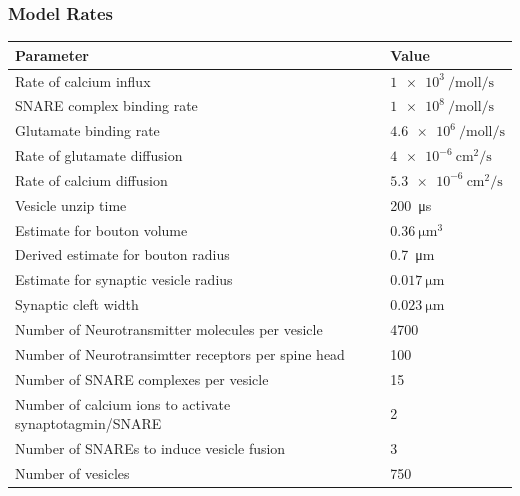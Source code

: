 \documentclass{beamer}
\begin{document}
\frame
{
\frametitle{Model Rates}
\begin{table}[H]
\tiny
\begin{tabular}{ll}
Parameter & Value \\ \hline
Rate of calcium influx   &  $\SI{1e3}{\per\mole\litre\per\second}$      \\
SNARE complex binding rate & $\SI{1e8}{\per\mol\litre\per\second}$ \\
Glutamate binding rate & $\SI{4.6e6}{\per\mol\litre\per\second}$ \\
Rate of glutamate diffusion & $\SI{4e-6}{\centi\metre\squared\per\second} $      \\
Rate of calcium diffusion & $\SI{5.3e-6}{\centi\metre\squared\per\second} $      \\
Vesicle unzip time & \SI{200}{\micro\second}  \\
Estimate for bouton volume&  $\SI{0.36}{\micro\meter\cubed}$\\ 
Derived estimate for bouton radius & \SI{0.7}{\micro\meter} \\
Estimate for synaptic vesicle radius & $\SI{0.017}{\micro\meter}$ \\ 
Synaptic cleft width &$\SI{0.023}{\micro\meter}$\\
Number of Neurotransmitter molecules per vesicle & 4700\\
Number of Neurotransimtter receptors per spine head & 100 \\
Number of SNARE complexes per vesicle & 15 \\ 
Number of calcium ions to activate synaptotagmin/SNARE & 2 \\
Number of SNAREs to induce vesicle fusion & 3 \\  
Number of vesicles & 750 \\
\end{tabular}
\end{table}
}

\end{document}
